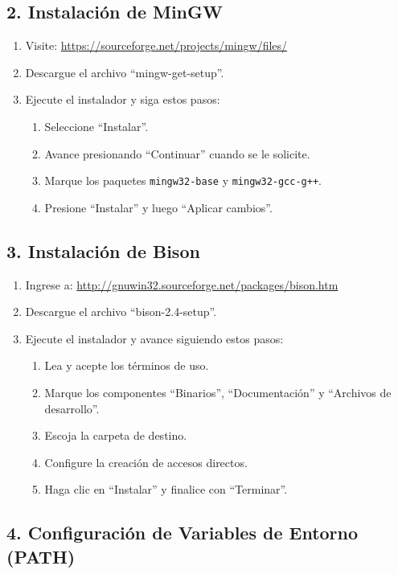 \documentclass{article}
\begin{document}
\subsection*{2. Instalación de MinGW}

\begin{enumerate}
    \item Visite: \url{https://sourceforge.net/projects/mingw/files/}
    \item Descargue el archivo ``mingw-get-setup''.
    \item Ejecute el instalador y siga estos pasos:
    \begin{enumerate}
        \item Seleccione ``Instalar''.
        \item Avance presionando ``Continuar'' cuando se le solicite.
        \item Marque los paquetes \texttt{mingw32-base} y \texttt{mingw32-gcc-g++}.
        \item Presione ``Instalar'' y luego ``Aplicar cambios''.
    \end{enumerate}
\end{enumerate}

\subsection*{3. Instalación de Bison}

\begin{enumerate}
    \item Ingrese a: \url{http://gnuwin32.sourceforge.net/packages/bison.htm}
    \item Descargue el archivo ``bison-2.4-setup''.
    \item Ejecute el instalador y avance siguiendo estos pasos:
    \begin{enumerate}
        \item Lea y acepte los términos de uso.
        \item Marque los componentes ``Binarios'', ``Documentación'' y ``Archivos de desarrollo''.
        \item Escoja la carpeta de destino.
        \item Configure la creación de accesos directos.
        \item Haga clic en ``Instalar'' y finalice con ``Terminar''.
    \end{enumerate}
\end{enumerate}

\subsection*{4. Configuración de Variables de Entorno (PATH)}
\end{document}
